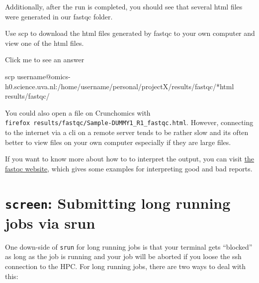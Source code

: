 \documentclass[
  letterpaper,
  DIV=11,
  numbers=noendperiod]{scrreprt}
\newenvironment{Shaded}{}{}
\newcommand{\FunctionTok}[1]{\textcolor[rgb]{0.44,0.26,0.76}{#1}}
\newcommand{\NormalTok}[1]{\textcolor[rgb]{0.14,0.16,0.18}{#1}}
\newcommand{\PreprocessorTok}[1]{\textcolor[rgb]{0.84,0.23,0.29}{#1}}
\begin{document}
Additionally, after the run is completed, you should see that several
html files were generated in our fastqc folder.

\begin{tcolorbox}[enhanced jigsaw, opacitybacktitle=0.6, titlerule=0mm, colbacktitle=quarto-callout-caution-color!10!white, arc=.35mm, leftrule=.75mm, colframe=quarto-callout-caution-color-frame, opacityback=0, bottomtitle=1mm, toprule=.15mm, coltitle=black, toptitle=1mm, title=\textcolor{quarto-callout-caution-color}{\faFire}\hspace{0.5em}{Exercise}, breakable, rightrule=.15mm, bottomrule=.15mm, colback=white, left=2mm]

Use scp to download the html files generated by fastqc to your own
computer and view one of the html files.

Click me to see an answer

\begin{Shaded}
\begin{Highlighting}[]
\FunctionTok{scp}\NormalTok{ username@omics{-}h0.science.uva.nl:/home/username/personal/projectX/results/fastqc/}\PreprocessorTok{*}\NormalTok{html results/fastqc/}
\end{Highlighting}
\end{Shaded}

You could also open a file on Crunchomics with
\texttt{firefox\ results/fastqc/Sample-DUMMY1\_R1\_fastqc.html}.
However, connecting to the internet via a cli on a remote server tends
to be rather slow and its often better to view files on your own
computer especially if they are large files.

If you want to know more about how to to interpret the output, you can
visit
\href{https://www.bioinformatics.babraham.ac.uk/projects/fastqc/}{the
fastqc website}, which gives some examples for interpreting good and bad
reports.

\end{tcolorbox}

\section{\texorpdfstring{\texttt{screen}: Submitting long running jobs
via
srun}{screen: Submitting long running jobs via srun}}\label{screen-submitting-long-running-jobs-via-srun}

One down-side of \texttt{srun} for long running jobs is that your
terminal gets ``blocked'' as long as the job is running and your job
will be aborted if you loose the ssh connection to the HPC. For long
running jobs, there are two ways to deal with this:
\end{document}
